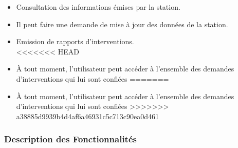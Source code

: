 \begin{enumerate}
	\begin{itemize}
	\item Consultation des informations émises par la station. \\
	\item Il peut faire une demande de mise à jour des données de la station.\\
	\item Emission de rapports d'interventions.\\
<<<<<<< HEAD
    \item À tout moment, l’utilisateur peut accéder à l’ensemble des demandes d’interventions 
    qui lui sont confiées
=======
    \item À tout moment, l’utilisateur peut accéder à l’ensemble des demandes d’interventions qui lui sont confiées
>>>>>>> a38885d9939b4d4af6a46931c5c713c90ea0d461
	\end{itemize}
\end{enumerate}


\subsubsection{Description des Fonctionnalités}

